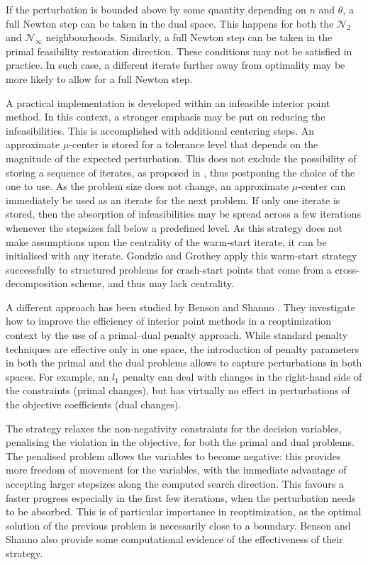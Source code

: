 If the perturbation is bounded above by some quantity depending 
on $n$ and $\theta$, a full Newton step can be taken in the dual space. 
This happens for both the $\mathcal{N}_2$ and $\mathcal{N}_\infty$ 
neighbourhoods. Similarly, a full Newton step can be taken in the 
primal feasibility restoration direction. These conditions may not 
be satisfied in practice. In such case, a different iterate further 
away from optimality may be more likely to allow for a full Newton step.

A practical implementation is developed within an infeasible interior 
point method. In this context, a stronger emphasis may be put on 
reducing the infeasibilities. This is accomplished with additional 
centering steps.
An approximate $\mu$-center is stored for a tolerance level that 
depends on the magnitude of the expected perturbation. This does not 
exclude the possibility of storing a sequence of iterates, as proposed 
in \cite{YildirimWright}, thus postponing the choice of the one to 
use.
As the problem size does not change, an approximate $\mu$-center 
can immediately be used as an iterate for the next problem.
If only one iterate is stored, then the absorption of infeasibilities 
may be spread across a few iterations whenever the stepsizes fall 
below a predefined level.
As this strategy does not make assumptions upon the centrality of the 
warm-start iterate,
it can be initialised with any iterate.
Gondzio and Grothey \cite{GondzioGrothey03} apply this warm-start 
strategy successfully to structured problems for crash-start points that 
come from a cross-decomposition scheme, and thus may lack centrality.

A different approach has been studied by Benson and Shanno 
\cite{BensonShanno}. They investigate how to improve the efficiency 
of interior point methods in a reoptimization context by the use of 
a primal--dual penalty approach.
While standard penalty techniques are effective only in one space, 
the introduction of penalty parameters in both the primal and the 
dual problems allows to capture perturbations in both spaces.
For example, an $l_1$ penalty can deal with changes in the right-hand
side of the constraints (primal changes), but has virtually no effect
in perturbations of the objective coefficients (dual changes).

The strategy relaxes the non-negativity constraints for the decision
variables, penalising the violation in the objective, for both
the primal and dual problems.
The penalised problem allows the variables to become negative: 
this provides more freedom of movement for the variables, with
the immediate advantage of accepting larger stepsizes along 
the computed search direction. This favours a faster progress
especially in the first few iterations, when the perturbation needs
to be absorbed.
This is of particular importance in reoptimization, as the optimal
solution of the previous problem is necessarily close to a boundary.
Benson and Shanno \cite{BensonShanno} also provide some computational
evidence of the effectiveness of their strategy.
